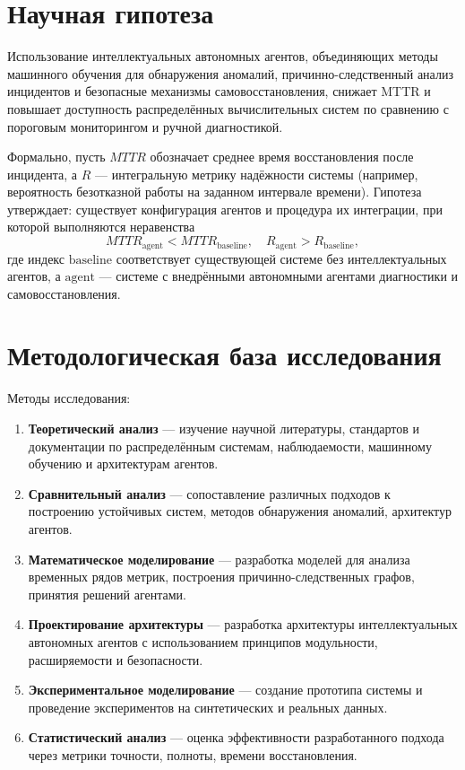 \section*{Научная гипотеза}

Использование интеллектуальных автономных агентов, объединяющих методы машинного обучения для обнаружения аномалий, причинно-следственный анализ инцидентов и безопасные механизмы самовосстановления, снижает MTTR и повышает доступность распределённых вычислительных систем по сравнению с пороговым мониторингом и ручной диагностикой.

Формально, пусть \(MTTR\) обозначает среднее время восстановления после инцидента, а \(R\) — интегральную метрику надёжности системы (например, вероятность безотказной работы на заданном интервале времени). Гипотеза утверждает: существует конфигурация агентов и процедура их интеграции, при которой выполняются неравенства
\begin{equation}
  MTTR_{\text{agent}} < MTTR_{\text{baseline}}, \quad
  R_{\text{agent}} > R_{\text{baseline}},
\label{eq:hypothesis_ineq}
\end{equation}
где индекс \(\text{baseline}\) соответствует существующей системе без интеллектуальных агентов, а \(\text{agent}\) — системе с внедрёнными автономными агентами диагностики и самовосстановления.

\section*{Методологическая база исследования}

Методы исследования:

\begin{enumerate}
    \item \textbf{Теоретический анализ} — изучение научной литературы, стандартов и документации по распределённым системам, наблюдаемости, машинному обучению и архитектурам агентов.

    \item \textbf{Сравнительный анализ} — сопоставление различных подходов к построению устойчивых систем, методов обнаружения аномалий, архитектур агентов.

    \item \textbf{Математическое моделирование} — разработка моделей для анализа временных рядов метрик, построения причинно-следственных графов, принятия решений агентами.

    \item \textbf{Проектирование архитектуры} — разработка архитектуры интеллектуальных автономных агентов с использованием принципов модульности, расширяемости и безопасности.

    \item \textbf{Экспериментальное моделирование} — создание прототипа системы и проведение экспериментов на синтетических и реальных данных.

    \item \textbf{Статистический анализ} — оценка эффективности разработанного подхода через метрики точности, полноты, времени восстановления.
\end{enumerate}

